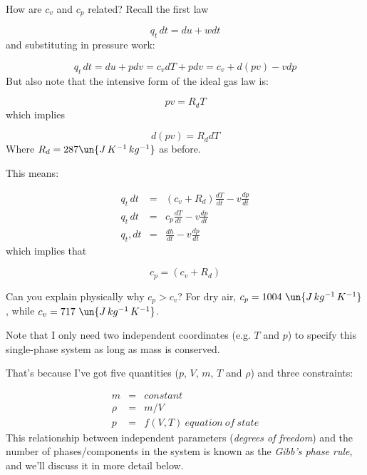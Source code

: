 \documentclass[12pt]{article}
\begin{document}
How are $c_v$ and $c_p$ related? Recall the first law

\begin{equation}
  q_t\, dt = du + w dt
\end{equation}
and substituting in pressure work:

\begin{equation}
  q_t\, dt = du + p dv = c_v dT + p dv = c_v + d(p v ) - v dp
\end{equation}
But also note that the intensive form of the ideal gas law is:

\begin{equation}
  \label{eq:eqstate}
  p v = R_d T
\end{equation}
which implies

\begin{equation}
  \label{eq:deqst}
  d (p v) =  R_d dT
\end{equation}
Where $R_d=287 \un{J\,K^{-1}\,kg^{-1}}$ as before. 


This means:


\begin{subequations}
\begin{eqnarray}
  \label{eq:firstlaw}
  q_t\, dt &=& (c_v + R_d) \frac{dT}{dt} - v \frac{dp}{dt}\\
  q_t\, dt &=& c_p \frac{dT}{dt} - v \frac{dp}{dt}\\
  q_t, dt &=& \frac{dh}{dt} - v \frac{dp}{dt}\label{eq:firstlawc}
\end{eqnarray}
\end{subequations}
which implies that

\begin{equation}
  \label{eq:intengas}
  c_p = (c_v + R_d)
\end{equation}

Can you explain physically why $c_p > c_v$?  For dry air, $c_p = 1004\ 
\un{J\,kg^{-1}\,K^{-1}}$, while $c_v = 717\ \un{J\,kg^{-1}\,K^{-1}}$.


Note that I only need two independent coordinates (e.g. $T$ and $p$)
to specify this single-phase system as long as mass is conserved.

That's because I've got five quantities ($p$, $V$, $m$, $T$ and
$\rho$) and three constraints:

\begin{subequations}
\begin{eqnarray}
  \label{eq:constraints}
  m &=& constant \\
  \rho &=& m/V \\ 
  p &=& f(V,T)\ \mathit{equation\ of\ state}
\end{eqnarray}
\end{subequations}
This relationship between independent parameters (\textit{degrees of
  freedom}) and the number of phases/components in the system is known
as the \textit{Gibb's phase rule}, and we'll discuss it in more detail below.
\end{document}
